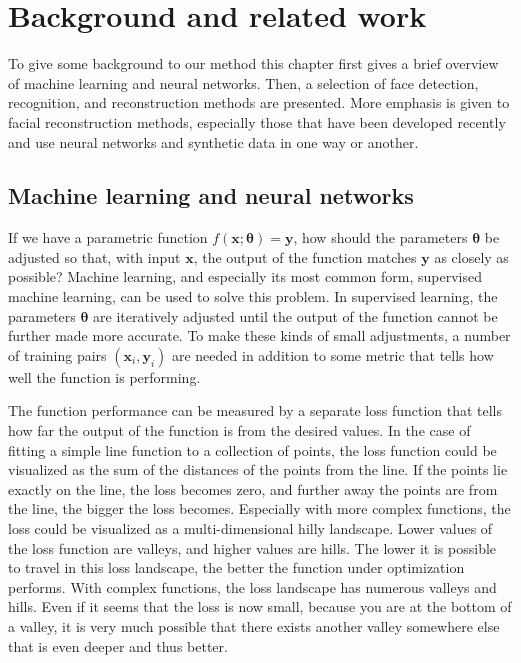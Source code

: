 \chapter{Background and related work}

To give some background to our method this chapter first gives a brief overview of machine learning and neural networks. Then, a selection of face detection, recognition, and reconstruction methods are presented. More emphasis is given to facial reconstruction methods, especially those that have been developed recently and use neural networks and synthetic data in one way or another.


\section{Machine learning and neural networks}

If we have a parametric function $f(\bm{x};\bm{\theta}) = \bm{y}$, how should the parameters $\bm{\theta}$ be adjusted so that, with input $\bm{x}$, the output of the function matches $\bm{y}$ as closely as possible? Machine learning, and especially its most common form, supervised machine learning, can be used to solve this problem. In supervised learning, the parameters $\bm{\theta}$ are iteratively adjusted until the output of the function cannot be further made more accurate. To make these kinds of small adjustments, a number of training pairs $(\bm{x}_i,\bm{y}_i)$ are needed in addition to some metric that tells how well the function is performing. \cite{Goodfellow2016,LeCun2015}

The function performance can be measured by a separate loss function that tells how far the output of the function is from the desired values. In the case of fitting a simple line function to a collection of points, the loss function could be visualized as the sum of the distances of the points from the line. If the points lie exactly on the line, the loss becomes zero, and further away the points are from the line, the bigger the loss becomes. Especially with more complex functions, the loss could be visualized as a multi-dimensional hilly landscape. Lower values of the loss function are valleys, and higher values are hills. The lower it is possible to travel in this loss landscape, the better the function under optimization performs. With complex functions, the loss landscape has numerous valleys and hills. Even if it seems that the loss is now small, because you are at the bottom of a valley, it is very much possible that there exists another valley somewhere else that is even deeper and thus better. \cite{Goodfellow2016,LeCun2015}

